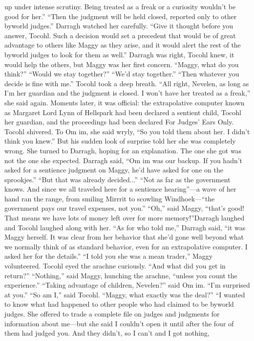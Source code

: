 \documentclass[9pt]{article}
\begin{document}
up under intense scrutiny. Being treated as a freak or a curiosity wouldn’t be good for her.”
“Then the judgment will be held closed, reported only to other byworld judges.” Darragh watched
her carefully. “Give it thought before you answer, Tocohl. Such a decision would set a precedent that
would be of great advantage to others like Maggy as they arise, and it would alert the rest of the byworld
judges to look for them as well.”
Darragh was right, Tocohl knew, it would help the others, but Maggy was her first concern. “Maggy,
what do you think?”
“Would we stay together?”
“We’d stay together.”
“Then whatever you decide is fine with me.”
Tocohl took a deep breath. “All right, Nevelen, as long as I’m her guardian and the judgment is
closed. I won’t have her treated as a freak,” she said again.
Moments later, it was official: the extrapolative computer known as Margaret Lord Lynn of
Hellspark had been declared a sentient child, Tocohl her guardian, and the proceedings had been
declared For Judges’ Ears Only.
Tocohl shivered. To Om im, she said wryly, “So you told them about her. I didn’t think you knew.”
But his sudden look of surprise told her she was completely wrong. She turned to Darragh, hoping for an
explanation.
The one she got was not the one she expected. Darragh said, “Om im was our backup. If you hadn’t
asked for a sentience judgment on Maggy, he’d have asked for one on the sprookjes.”
“But that was already decided...”
“Not as far as the government knows. And since we all traveled here for a sentience hearing”—a
wave of her hand ran the range, from smiling Mirrrit to scowling Windhoek—“the government pays our
travel expenses, not you.”
“Oh,” said Maggy, “that’s good! That means we have lots of money left over for more memory!”Darragh laughed and Tocohl laughed along with her. “As for who told me,” Darragh said, “it was
Maggy herself. It was clear from her behavior that she’d gone well beyond what we normally think of as
standard behavior, even for an extrapolative computer. I asked her for the details.”
“I told you she was a mean trader,” Maggy volunteered.
Tocohl eyed the arachne curiously. “And what did you get in return?”
“Nothing,” said Maggy, hunching the arachne, “unless you count the experience.”
“Taking advantage of children, Nevelen?” said Om im. “I’m surprised at you.”
“So am I,” said Tocohl. “Maggy, what exactly was the deal?”
“I wanted to know what had happened to other people who had claimed to be byworld judges. She
offered to trade a complete file on judges and judgments for information about me—but she said I
couldn’t open it until after the four of them had judged you. And they didn’t, so I can’t and I got nothing,
\end{document}

